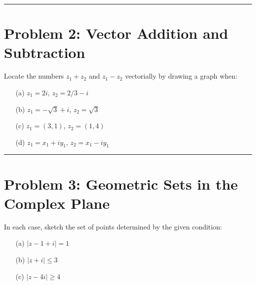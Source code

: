 \documentclass{article}
\begin{document}
\vspace{.5cm} %

\hrule %

\newpage
\section*{Problem 2: Vector Addition and Subtraction}
Locate the numbers $z_1+z_2$ and $z_1 - z_2$ vectorially by drawing a graph when:

\begin{enumerate}
    \item[(a)] $z_1 = 2i$, $z_2 = 2/3-i$
    
    \vspace{.5cm} %
    
    \item[(b)] $z_1 = -\sqrt{3}+i$, $z_2 = \sqrt{3}$
    
    \vspace{.5cm} %
    
    \item[(c)] $z_1 = (3,1)$, $z_2 = (1,4)$
    
    \vspace{.5cm} %
    
    \item[(d)] $z_1 = x_1+iy_1$, $z_2 = x_1-iy_1$
    
    \vspace{.5cm} %
\end{enumerate}

\hrule

\newpage
\section*{Problem 3: Geometric Sets in the Complex Plane}
In each case, sketch the set of points determined by the given condition:

\begin{enumerate}
    \item[(a)] $|z-1+i|=1$
    
    \vspace{.5cm} %
    
    \item[(b)] $|z+i| \leq 3$
    
    \vspace{.5cm} %
    
    \item[(c)] $|z-4i|\geq4$
    
    \vspace{.5cm} %
\end{enumerate}
\end{document}
